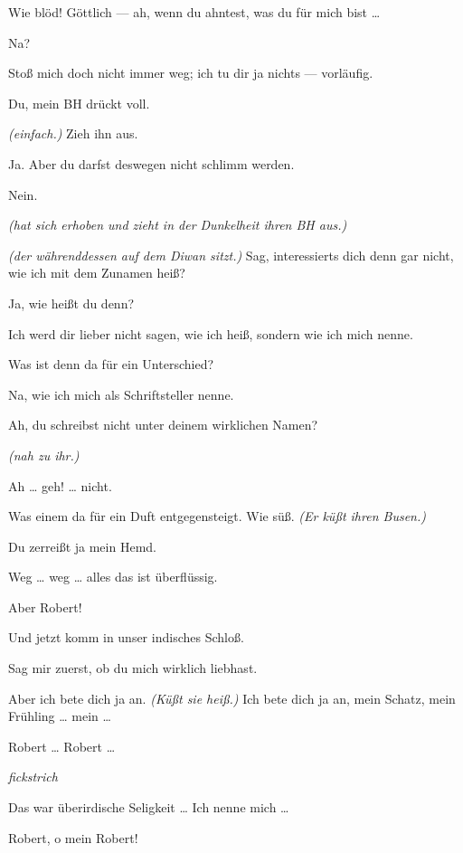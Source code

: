 \documentclass[
	final,
	a4paper,
	ngerman,
	mpinclude = true, %
	twoside = true,
	open = right,
	cleardoublepage = plain,
	DIV = 13,
	BCOR = 1cm,
	titlepage = firstiscover,
	]{scrbook}
\newcommand{\direction}[1]{\textit{(#1)}}
\newcommand{\hiat}{%
	\begin{center}
		\tiny
		\raisebox{0.5ex}{\rule{0.3\linewidth}{0.4pt}}
		\textit{fickstrich}
		\raisebox{0.5ex}{\rule{0.3\linewidth}{0.4pt}}
	\end{center}
}
\newcommand{\thecharacter}[1]{\textup{\textsc{#1}}\xspace}
\newcommand{\thesuesse}{\thecharacter{Lola}}
\newcommand{\thedichter}{\thecharacter{Robert Bibitz}}
\newcommand{\character}[1]{\item[#1:]}
\newcommand{\suesse}{\character{\thesuesse}}
\newcommand{\dichter}{\character{\thedichter}}
\begin{document}
\begin{play}
	\dichter
	Wie blöd! Göttlich --- ah, wenn du ahntest, was du für mich bist \ldots{}

	\suesse
	Na?

	\dichter
	Stoß mich doch nicht immer weg; ich tu dir ja nichts --- vorläufig.

	\suesse
	Du, mein BH drückt voll.

	\dichter
	\direction{einfach.} Zieh ihn aus.

	\suesse
	Ja. Aber du darfst deswegen nicht schlimm werden.

	\dichter
	Nein.

	\suesse
	\direction{hat sich erhoben und zieht in der Dunkelheit ihren BH aus.}

	\dichter
	\direction{der währenddessen auf dem Diwan sitzt.} Sag, interessierts dich denn gar nicht, wie ich mit dem Zunamen heiß?

	\suesse
	Ja, wie heißt du denn?

	\dichter
	Ich werd dir lieber nicht sagen, wie ich heiß, sondern wie ich mich nenne.

	\suesse
	Was ist denn da für ein Unterschied?

	\dichter
	Na, wie ich mich als Schriftsteller nenne.

	\suesse
	Ah, du schreibst nicht unter deinem wirklichen Namen?

	\dichter
	\direction{nah zu ihr.}

	\suesse
	Ah \ldots{} geh! \ldots{} nicht.

	\dichter
	Was einem da für ein Duft entgegensteigt. Wie süß. \direction{Er küßt ihren Busen.}

	\suesse
	Du zerreißt ja mein Hemd.

	\dichter
	Weg \ldots{} weg \ldots{} alles das ist überflüssig.

	\suesse
	Aber Robert!

	\dichter
	Und jetzt komm in unser indisches Schloß.

	\suesse
	Sag mir zuerst, ob du mich wirklich liebhast.

	\dichter
	Aber ich bete dich ja an. \direction{Küßt sie heiß.} Ich bete dich ja an, mein Schatz, mein Frühling \ldots{} mein \ldots{}

	\suesse
	Robert \ldots{} Robert \ldots{}

	\hiat

	\dichter
	Das war überirdische Seligkeit \ldots{} Ich nenne mich \ldots{}

	\suesse
	Robert, o mein Robert!


\end{play}
\end{document}
